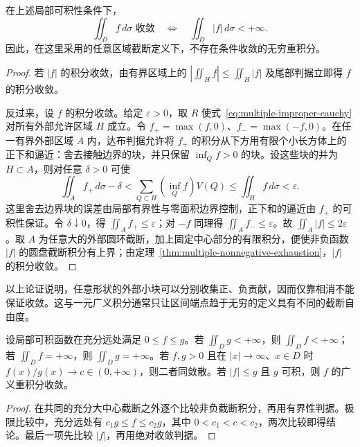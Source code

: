 \begin{theorem}[收敛与绝对收敛等价]
\label{thm:multiple-improper-absolute}
在上述局部可积性条件下，
\begin{equation}
    \iint_Df\,d\sigma\text{ 收敛}
    \quad\Longleftrightarrow\quad
    \iint_D|f|\,d\sigma<+\infty.
    \label{eq:multiple-improper-absolute}
\end{equation}
因此，在这里采用的任意区域截断定义下，不存在条件收敛的无穷重积分。
\end{theorem}
\begin{proof}
若 $|f|$ 的积分收敛，由有界区域上的 $|\iint_Hf|\leq\iint_H|f|$ 及尾部判据立即得 $f$ 的积分收敛。

反过来，设 $f$ 的积分收敛。给定 $\varepsilon>0$，取 $R$ 使式~\eqref{eq:multiple-improper-cauchy} 对所有外部允许区域 $H$ 成立。令 $f_+=\max(f,0)$、$f_-=\max(-f,0)$。在任一有界外部区域 $A$ 内，达布判据允许将 $f_+$ 的积分从下方用有限个小长方体上的正下和逼近：舍去接触边界的块，并只保留 $\inf_Q f>0$ 的块。设这些块的并为 $H\subset A$，则对任意 $\delta>0$ 可使
\[
    \iint_Af_+\,d\sigma-\delta
    <\sum_{Q\subset H}(\inf_Q f)V(Q)
    \leq\iint_Hf\,d\sigma<\varepsilon.
\]
这里舍去边界块的误差由局部有界性与零面积边界控制，正下和的逼近由 $f_+$ 的可积性保证。令 $\delta\downarrow0$，得 $\iint_Af_+\leq\varepsilon$；对 $-f$ 同理得 $\iint_Af_-\leq\varepsilon$。故 $\iint_A|f|\leq2\varepsilon$。取 $A$ 为任意大的外部圆环截断，加上固定中心部分的有限积分，便使非负函数 $|f|$ 的圆盘截断积分有上界；由定理~\ref{thm:multiple-nonnegative-exhaustion}，$|f|$ 的积分收敛。
\end{proof}

以上论证说明，任意形状的外部小块可以分别收集正、负贡献，因而仅靠相消不能保证收敛。这与一元广义积分通常只让区间端点趋于无穷的定义具有不同的截断自由度。

\begin{proposition}[比较判别法]
\label{prop:multiple-improper-comparison}
设局部可积函数在充分远处满足 $0\leq f\leq g$。若 $\iint_Dg<+\infty$，则 $\iint_Df<+\infty$；若 $\iint_Df=+\infty$，则 $\iint_Dg=+\infty$。若 $f,g>0$ 且在 $|x|\to\infty$、$x\in D$ 时 $f(x)/g(x)\to c\in(0,+\infty)$，则二者同敛散。若 $|f|\leq g$ 且 $g$ 可积，则 $f$ 的广义重积分收敛。
\end{proposition}
\begin{proof}
在共同的充分大中心截断之外逐个比较非负截断积分，再用有界性判据。极限比较中，充分远处有 $c_1g\leq f\leq c_2g$，其中 $0<c_1<c<c_2$，两次比较即得结论。最后一项先比较 $|f|$，再用绝对收敛判据。
\end{proof}

